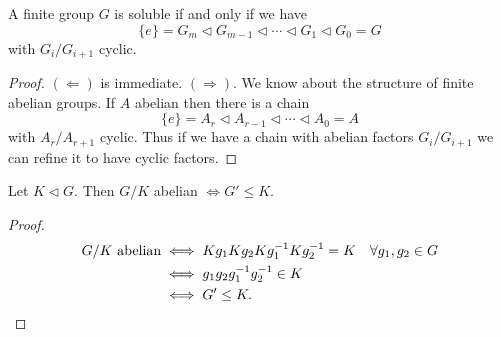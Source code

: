 \documentclass{article}
\begin{document}
\begin{nlemma}\label{lem:4.16}
    A finite group $G$ is soluble if and only if we have
    \begin{equation*}
        \{e\} = G_m \lhd G_{m-1} \lhd \dotsb \lhd G_1 \lhd G_0 = G
    \end{equation*}
    with $G_i/G_{i+1}$ cyclic.
\end{nlemma}
\begin{proof}
    $(\Leftarrow)$ is immediate.
    $(\Rightarrow)$. We know about the structure of finite abelian groups.
    If $A$ abelian then there is a chain
    \begin{equation*}
        \{e\} = A_r \lhd A_{r-1} \lhd \dotsb \lhd A_0 = A
    \end{equation*}
    with $A_r / A_{r+1}$ cyclic.
    Thus if we have a chain with abelian factors $G_i/G_{i+1}$ we can refine it to have cyclic factors.
\end{proof}

\begin{nlemma}\label{lem:4.18}
    Let $K \lhd G$. Then $G/K$ abelian $\iff G' \leq K$.
\end{nlemma}
\begin{proof}
    \begin{align*}
        G/K \text{ abelian} &\iff Kg_1 Kg_2 Kg_1^{-1} K g_2^{-1} = K \quad \forall g_1, g_2 \in G\\
                            &\iff g_1 g_2 g_1^{-1} g_2^{-1} \in K \\
                            &\iff G' \leq K. \qedhere
    \end{align*}\qedhere
\end{proof}
\end{document}
